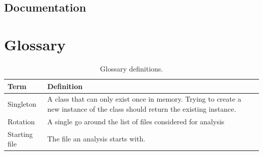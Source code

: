 \documentclass[11pt]{article} %
\begin{document}
    \subsection{Documentation}\label{sec:3.4}


    \newpage



    \section{Glossary}

    \begin{table}[H]
        \centering
        \begin{tabular}{p{.3\linewidth} | p{.6\linewidth}}
            \textbf{Term} & \textbf{Definition}
            \\\hline
            Singleton & A class that can only exist once in memory. Trying to create a new instance of the class
            should return the existing instance. \\\hline
            Rotation      & A single go around the list of files considered for analysis \\\hline
            Starting file & The file an analysis starts with.
        \end{tabular}
        \caption{Glossary definitions.}
        \label{tab:glossary}
    \end{table}
    \printbibliography[heading=bibintoc]
    \listoffigures
    \listoftables
\end{document}
